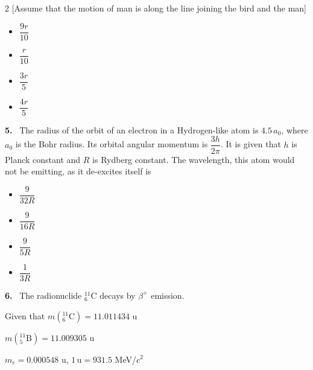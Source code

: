 \documentclass[10pt]{extarticle}
\newcommand{\qn}[1]{\par\smallskip\noindent\textbf{#1.}~}
\newenvironment{qoptions}{\begin{itemize}[leftmargin=1.8em,itemsep=1pt,topsep=2pt,label={}]}{\end{itemize}}
\newcommand{\opt}[2]{\item[(#1)] #2}
\begin{document}
\begin{multicols}{2}
[Assume that the motion of man is along the line joining the bird and the man]
\begin{qoptions}
\opt{A}{$\dfrac{9r}{10}$}
\opt{B}{$\dfrac{r}{10}$}
\opt{C}{$\dfrac{3r}{5}$}
\opt{D}{$\dfrac{4r}{5}$}
\end{qoptions}
\qn{5} The radius of the orbit of an electron in a Hydrogen-like atom is $4.5\,a_0$, where $a_0$ is the Bohr radius. Its orbital angular momentum is $\dfrac{3h}{2\pi}$. It is given that $h$ is Planck constant and $R$ is Rydberg constant. The wavelength, this atom would not be emitting, as it de-excites itself is
\begin{qoptions}
\opt{A}{$\dfrac{9}{32R}$}
\opt{B}{$\dfrac{9}{16R}$}
\opt{C}{$\dfrac{9}{5R}$}
\opt{D}{$\dfrac{1}{3R}$}
\end{qoptions}
\qn{6} The radionuclide ${}^{11}_{6}\mathrm{C}$ decays by $\beta^+$ emission.

Given that $m({}^{11}_{6}\mathrm{C})=11.011434$ u

$m({}^{11}_{5}\mathrm{B})=11.009305$ u

$m_e=0.000548$ u, $1\,\mathrm{u}=931.5$ MeV/$c^2$


\end{multicols}
\end{document}
